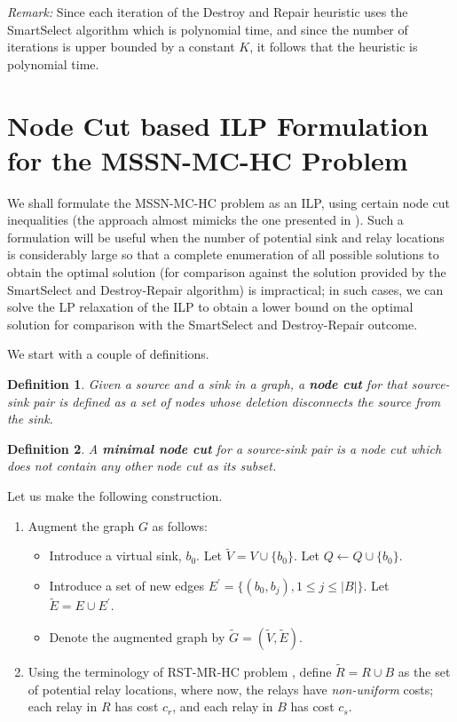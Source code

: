 \documentclass[conference]{IEEEtran}
\newcommand{\remark}[1]{{\emph{Remark:}} #1}
\newtheorem{definition}{Definition}
\begin{document}
\remark Since each iteration of the Destroy and Repair heuristic uses the SmartSelect algorithm which is polynomial time, and since the number of iterations is upper bounded by a constant $K$, it follows that the heuristic is polynomial time. 

\section{Node Cut based ILP Formulation for the MSSN-MC-HC Problem}
\label{sec:ilp-oneconnect}
We shall formulate the MSSN-MC-HC problem as an ILP, using certain node cut inequalities (the approach almost mimicks the one presented in \cite{fullpaper}). Such a formulation will be useful when the number of potential sink and relay locations is considerably large so that a complete enumeration of all possible solutions to obtain the optimal solution (for comparison against the solution provided by the SmartSelect and Destroy-Repair algorithm) is impractical; in such cases, we can solve the LP relaxation of the ILP to obtain a lower bound on the optimal solution for comparison with the SmartSelect and Destroy-Repair outcome. 

\noindent
We start with a couple of definitions.

\begin{definition}
Given a source and a sink in a graph, a \emph{\textbf{node cut} for that source-sink pair} is defined as a set of nodes whose deletion disconnects the source from the sink. 
\end{definition}

\begin{definition}
A \emph{\textbf{minimal node cut} for a source-sink pair} is a node cut which does not contain any other node cut as its subset. 
\end{definition}

Let us make the following construction.

\begin{enumerate}
\item Augment the graph $G$ as follows:
\begin{itemize}
\item Introduce a virtual sink, $b_0$. Let $\tilde{V}=V\cup \{b_0\}$. Let $Q\leftarrow Q\cup \{b_0\}$.
\item Introduce a set of new edges $E^{\prime}=\{(b_0,b_j),1\leq j\leq |B|\}$. Let $\tilde{E}=E\cup E^{\prime}$.
\item Denote the augmented graph by $\tilde{G}=(\tilde{V},\tilde{E})$.
\end{itemize}
\item Using the terminology of RST-MR-HC problem \cite{fullpaper}, define $\tilde{R}= R\cup B$ as the set of potential relay locations, where now, the relays have \emph{non-uniform} costs; each relay in $R$ has cost $c_r$, and each relay in $B$ has cost $c_s$. 
\end{enumerate}
\end{document}
